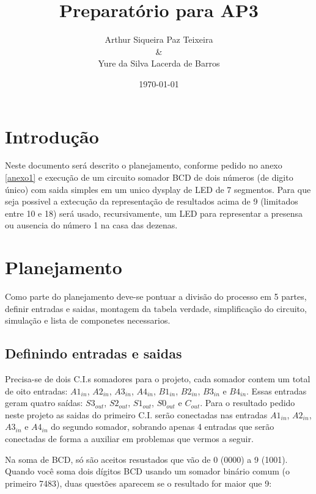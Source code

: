 \documentclass[11pt]{report}         %
\title{\textbf{Preparatório para AP3}}
\author{Arthur Siqueira Paz Teixeira \\ \& \\ Yure da Silva Lacerda de Barros}
\affil{Disciplina: Circuitos Lógicos -- Professor: Fabio Marujo}
\date{\today}
\begin{document}

\maketitle                        %
\tableofcontents                  %

\chapter {Introdução}             %

Neste documento será descrito o planejamento, conforme pedido no anexo \ref{anexo1} e execução de um circuito somador BCD de dois números (de digito único) 
com saida simples em um unico dysplay de LED de 7 segmentos. Para que seja possivel a extecução da representação de resultados acima de 9 
(limitados entre 10 e 18) será usado, recursivamente, um LED para representar a presensa ou ausencia do número 1 na casa das dezenas.

\chapter {Planejamento}

Como parte do planejamento deve-se pontuar a divisão do processo em 5 partes, definir entradas e saidas, montagem da tabela verdade, simplificação do
circuito, simulação e lista de componetes necessarios.

\section {Definindo entradas e saidas}

Precisa-se de dois C.I.s somadores para o projeto, cada somador contem um total de oito entradas: $A1_{in}$, $A2_{in}$, $A3_{in}$, $A4_{in}$, $B1_{in}$, 
$B2_{in}$, $B3_{in}$ e $B4_{in}$. Essas entradas geram quatro saídas: $S3_{out}$, $S2_{out}$, $S1_{out}$, $S0_{out}$ e $C_{out}$. Para o resultado pedido 
neste projeto as saidas do primeiro C.I. serão conectadas nas entradas $A1_{in}$, $A2_{in}$, $A3_{in}$ e $A4_{in}$ do segundo somador, sobrando apenas 
4 entradas que serão conectadas de forma a auxiliar em problemas que vermos a seguir.

Na soma de BCD, só são aceitos resustados que vão de 0 (0000) a 9 (1001). Quando você soma dois dígitos BCD usando um somador binário comum (o primeiro 7483), 
duas questões aparecem se o resultado for maior que 9:
\end{document}
